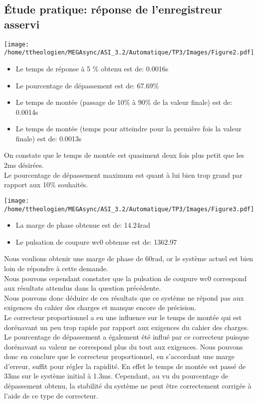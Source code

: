 \documentclass[a4paper,12pt]{article}
\begin{document}
		\subsection{Étude pratique: réponse de l'enregistreur asservi}
			\begin{center}
				\texttt{[image: /home/ttheologien/MEGAsync/ASI\_3.2/Automatique/TP3/Images/Figure2.pdf]}
			\end{center}
			\begin{itemize}
				\item Le temps de réponse à 5 \% obtenu est de: 0.0016s
				\item Le pourcentage de dépassement est de: 67.69\%
				\item Le temps de montée (passage de 10\% à 90\% de la valeur finale) est de: 0.0014s
				\item Le temps de montée (temps pour atteindre pour la première fois la valeur finale) est de: 0.0013s
			\end{itemize}
			On constate que le temps de montée est quasiment deux fois plus petit que les 2ms désirées. \\
			Le pourcentage de dépassement maximum est quant à lui bien trop grand par rapport aux 10\% souhaités.
			\begin{center}
				\texttt{[image: /home/ttheologien/MEGAsync/ASI\_3.2/Automatique/TP3/Images/Figure3.pdf]}
			\end{center}
			\begin{itemize}
				\item La marge de phase obtenue est de: 14.24rad
				\item Le pulsation de coupure wc0 obtenue est de: 1362.97
			\end{itemize}
			Nous voulions obtenir une marge de phase de 60rad, or le système actuel est bien loin de répondre à cette demande. \\
			Nous pouvons cependant constater que la pulsation de coupure wc0 correspond aux résultats attendus dans la question précédente. \\
			Nous pouvons donc déduire de ces résultats que ce système ne répond pas aux exigences du cahier des charges et manque encore de précision.\\
			Le correcteur proportionnel a eu une influence sur le temps de montée qui est dorénavant un peu trop rapide par rapport aux exigences du cahier des charges. Le pourcentage de dépassement a également été influé par ce correcteur puisque dorénavant sa valeur ne correspond plus du tout aux exigences. Nous pouvons donc en conclure que le correcteur proportionnel, en s'accordant une marge d'erreur, suffit pour régler la rapidité. En effet le temps de montée est passé de 33ms sur le système initial à 1.3ms. Cependant, au vu du pourcentage de dépassement obtenu, la stabilité du système ne peut être correctement corrigée à l'aide de ce type de correcteur.
			\newpage
\end{document}
